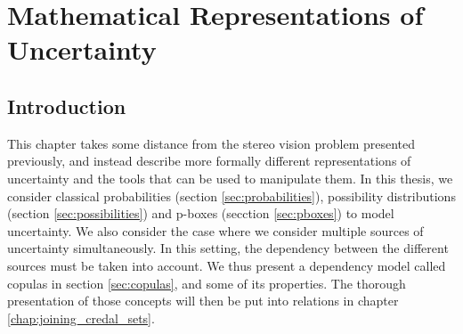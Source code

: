 \chapter{Mathematical Representations of Uncertainty}\label{chap:representation_of_uncertainty}

\section{Introduction}
This chapter takes some distance from the stereo vision problem presented previously, and instead describe more formally different representations of uncertainty and the tools that can be used to manipulate them. In this thesis, we consider classical probabilities (section \ref{sec:probabilities}), possibility distributions (section \ref{sec:possibilities}) and p-boxes (secction \ref{sec:pboxes}) to model uncertainty. We also consider the case where we consider multiple sources of uncertainty simultaneously. In this setting, the dependency between the different sources must be taken into account. We thus present a dependency model called copulas in section \ref{sec:copulas}, and some of its properties. The thorough presentation of those concepts will then be put into relations in chapter \ref{chap:joining_credal_sets}. 

